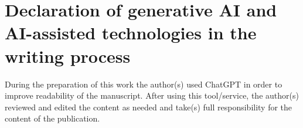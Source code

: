 \documentclass[11pt]{article}
\begin{document}
\newpage

\section*{Declaration of generative AI and AI-assisted technologies in the writing process}
During the preparation of this work the author(s) used ChatGPT in order to improve readability of the manuscript. After using this tool/service, the author(s) reviewed and edited the content as needed and take(s) full responsibility for the content of the publication.









\newpage










\end{document}
